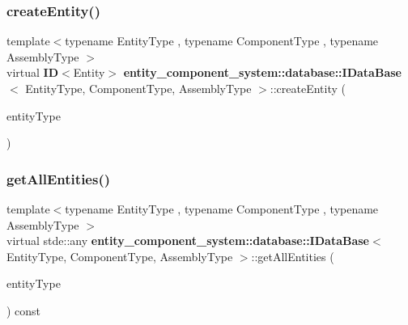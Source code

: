 \label{classentity__component__system_1_1database_1_1_i_data_base_ade6b15fec900be773f3ef01f04dc1bb2} 
\subsubsection{create\+Entity()}
{\footnotesize\ttfamily template$<$typename Entity\+Type , typename Component\+Type , typename Assembly\+Type $>$ \\
virtual {\bf ID}$<$Entity$>$ {\bf entity\+\_\+component\+\_\+system\+::database\+::\+I\+Data\+Base}$<$ Entity\+Type, Component\+Type, Assembly\+Type $>$\+::create\+Entity (\begin{DoxyParamCaption}\item[{Entity\+Type const}]{entity\+Type }\end{DoxyParamCaption})\hspace{0.3cm}{\ttfamily [pure virtual]}}

\label{classentity__component__system_1_1database_1_1_i_data_base_abad727d40380efadf24294e9ab1e5465} 
\subsubsection{get\+All\+Entities()}
{\footnotesize\ttfamily template$<$typename Entity\+Type , typename Component\+Type , typename Assembly\+Type $>$ \\
virtual stde\+::any {\bf entity\+\_\+component\+\_\+system\+::database\+::\+I\+Data\+Base}$<$ Entity\+Type, Component\+Type, Assembly\+Type $>$\+::get\+All\+Entities (\begin{DoxyParamCaption}\item[{Entity\+Type const}]{entity\+Type }\end{DoxyParamCaption}) const\hspace{0.3cm}{\ttfamily [pure virtual]}}

